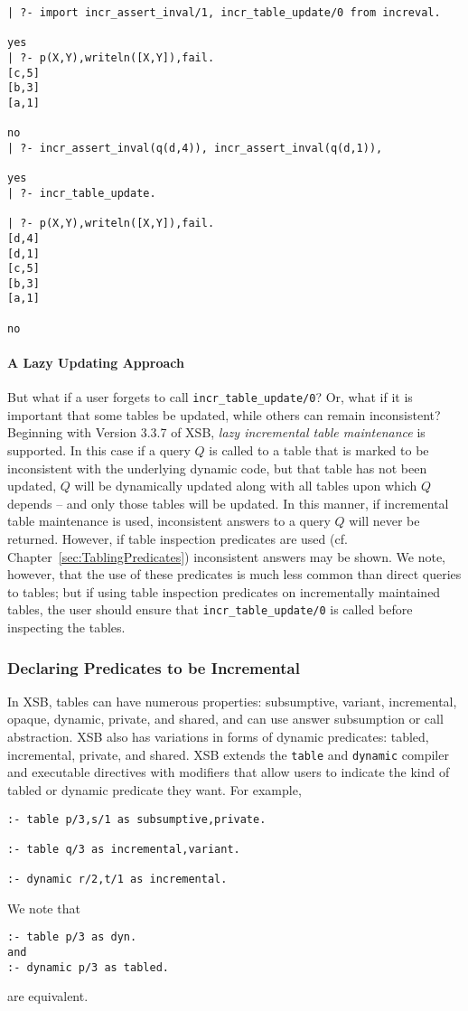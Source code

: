 \begin{verbatim}
| ?- import incr_assert_inval/1, incr_table_update/0 from increval.

yes
| ?- p(X,Y),writeln([X,Y]),fail.
[c,5]
[b,3]
[a,1]

no
| ?- incr_assert_inval(q(d,4)), incr_assert_inval(q(d,1)), 

yes
| ?- incr_table_update.

| ?- p(X,Y),writeln([X,Y]),fail.
[d,4]
[d,1]
[c,5]
[b,3]
[a,1]

no
\end{verbatim}

\paragraph{A Lazy Updating Approach}
%
But what if a user forgets to call {\tt incr\_table\_update/0}?  Or,
what if it is important that some tables be updated, while others can
remain inconsistent?  Beginning with Version 3.3.7 of XSB, {\em lazy
  incremental table maintenance} is supported.  In this case if a
query $Q$ is called to a table that is marked to be inconsistent with
the underlying dynamic code, but that table has not been updated, $Q$
will be dynamically updated along with all tables upon which $Q$
depends -- and only those tables will be updated.  In this manner, if
incremental table maintenance is used, inconsistent answers to a query
$Q$ will never be returned.  However, if table inspection predicates
are used (cf. Chapter~\ref{sec:TablingPredicates}) inconsistent
answers may be shown.  We note, however, that the use of these
predicates is much less common than direct queries to tables; but if
using table inspection predicates on incrementally maintained tables,
the user should ensure that {\tt incr\_table\_update/0} is called
before inspecting the tables.

\subsubsection{Declaring Predicates to be Incremental}
%
In XSB, tables can have numerous properties: subsumptive, variant,
incremental, opaque, dynamic, private, and shared, and can use answer
subsumption or call abstraction.  XSB also has variations in forms of
dynamic predicates: tabled, incremental, private, and shared.  XSB
extends the {\tt table} and {\tt dynamic} compiler and executable
directives with modifiers that allow users to indicate the kind of
tabled or dynamic predicate they want.  For example,
%
\begin{verbatim}
:- table p/3,s/1 as subsumptive,private.

:- table q/3 as incremental,variant.

:- dynamic r/2,t/1 as incremental.
\end{verbatim}
We note that
\begin{verbatim}
:- table p/3 as dyn.
and
:- dynamic p/3 as tabled.
\end{verbatim}
are equivalent.

